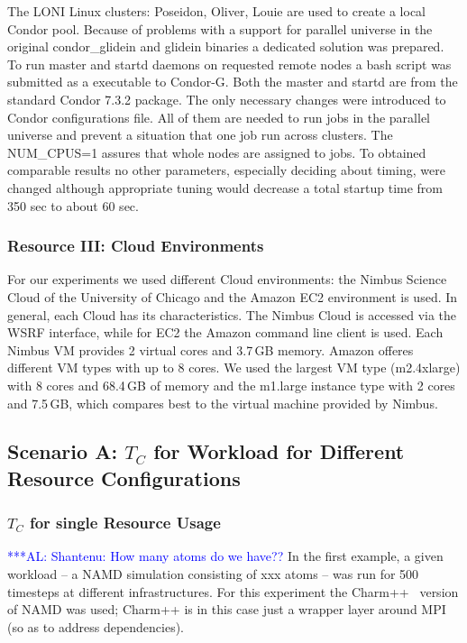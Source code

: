 \documentclass[conference,final]{IEEEtran}
\newcommand{\tc}{$T_{C}$ }
\newcommand{\alnote}[1]{ {\textcolor{blue} { ***AL: #1 }}}
\newcommand{\alnote}[1]{}
\begin{document}
The LONI Linux clusters: Poseidon, Oliver, Louie are used to create a local
Condor pool. Because of problems with a support for parallel universe in the
original condor\_glidein and glidein binaries a dedicated solution was prepared.
To run master and startd daemons on requested remote nodes a bash script was
submitted as a executable to Condor-G. Both the master and startd are from the
standard Condor 7.3.2 package. The only necessary changes were introduced to
Condor configurations file. All of them are needed to run jobs in the parallel
universe and prevent a situation that one job run across clusters. The NUM\_CPUS=1
assures that whole nodes are assigned to jobs.
To obtained comparable results no other parameters, especially deciding about
timing, were changed although appropriate tuning would decrease a total
startup time from 350 sec to about 60 sec.


\subsubsection*{Resource III: Cloud Environments}

For our experiments we used different Cloud environments: 
the Nimbus Science Cloud of the University of Chicago and the 
Amazon EC2 environment is used. In general, each Cloud has 
its characteristics. The Nimbus Cloud is accessed via the WSRF
interface, while for EC2 the Amazon command line 
client is used. Each Nimbus VM provides 2 virtual cores and 3.7\,GB memory. 
Amazon offeres different VM types with up to 8 cores. We used 
the largest VM type (m2.4xlarge) with 8 cores and 68.4\,GB of memory
and the m1.large instance type with 2 cores and 7.5\,GB, which compares
best to the virtual machine provided by Nimbus. 

\subsection{Scenario A: \tc for Workload for Different Resource Configurations}

\subsubsection{\tc for single Resource Usage}
\alnote{Shantenu: How many atoms do we have??}
In the first example, a given workload -- a NAMD simulation consisting
of xxx atoms -- was run for 500 timesteps at different
infrastructures. For this experiment the Charm++~\cite{871085} version
of NAMD was used; Charm++ is in this case just a wrapper layer around
MPI (so as to address dependencies).
\end{document}
